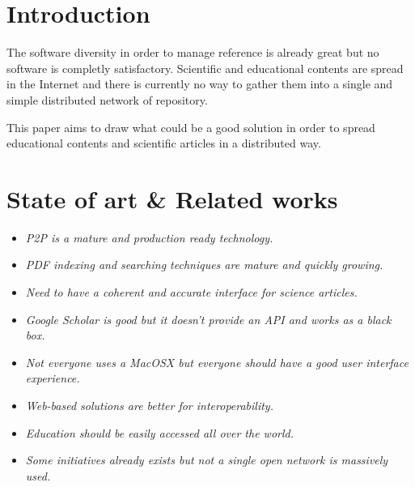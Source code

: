 \section{Introduction}

The software diversity in order to manage reference is already
great but no software is completly satisfactory. Scientific and
educational contents are spread in the Internet and there is currently
no way to gather them into a single and simple distributed network of repository.

This paper aims to draw what could be a good solution in order to
spread educational contents and scientific articles in a distributed
way.


\section{State of art \& Related works}

\begin{itemize}

\item \textit{P2P is a mature and production ready technology.}

\item \textit{PDF indexing and searching techniques are mature and quickly growing.}

\item \textit{Need to have a coherent and accurate interface for science articles.}

\end{itemize}

\begin{itemize}

\item \textit{Google Scholar is good but it doesn't provide an API and works as a black box.}

\item \textit{Not everyone uses a MacOSX but everyone should have a good user interface experience.}

\item \textit{Web-based solutions are better for interoperability.}

\item \textit{Education should be easily accessed all over the world.}

\item \textit{Some initiatives already exists but not a single open network is massively used.}

\end{itemize}

